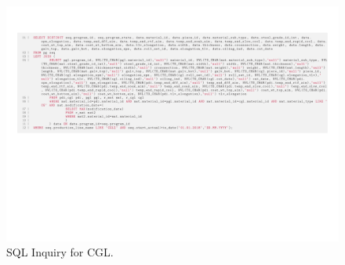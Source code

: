 \begin{landscape}
	\begin{figure}[ht]
		\centering
		\hspace*{-2cm}
		\includegraphics[width=1.7\textwidth]{../database_inquiries/CGL.pdf}
		\vspace*{-8cm}
		\caption{SQL Inquiry for CGL.}
		\label{figure-supplements-CGL-SQL}
	\end{figure}
\end{landscape}